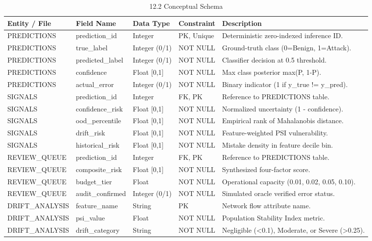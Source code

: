 \begin{table}[H]
\centering
\small
\begin{tabular}{p{} p{} p{} p{} p{}}
\toprule
\textbf{Entity / File} & \textbf{Field Name} & \textbf{Data Type} & \textbf{Constraint} & \textbf{Description} \\
\midrule
PREDICTIONS & prediction\_id & Integer & PK, Unique & Deterministic zero-indexed inference ID. \\
PREDICTIONS & true\_label & Integer (0/1) & NOT NULL & Ground-truth class (0=Benign, 1=Attack). \\
PREDICTIONS & predicted\_label & Integer (0/1) & NOT NULL & Classifier decision at 0.5 threshold. \\
PREDICTIONS & confidence & Float [0,1] & NOT NULL & Max class posterior max(P, 1-P). \\
PREDICTIONS & actual\_error & Integer (0/1) & NOT NULL & Binary indicator (1 if y\_true != y\_pred). \\
SIGNALS & prediction\_id & Integer & FK, PK & Reference to PREDICTIONS table. \\
SIGNALS & confidence\_risk & Float [0,1] & NOT NULL & Normalized uncertainty (1 - confidence). \\
SIGNALS & ood\_percentile & Float [0,1] & NOT NULL & Empirical rank of Mahalanobis distance. \\
SIGNALS & drift\_risk & Float [0,1] & NOT NULL & Feature-weighted PSI vulnerability. \\
SIGNALS & historical\_risk & Float [0,1] & NOT NULL & Mistake density in feature decile bin. \\
REVIEW\_QUEUE & prediction\_id & Integer & FK, PK & Reference to PREDICTIONS table. \\
REVIEW\_QUEUE & composite\_risk & Float [0,1] & NOT NULL & Synthesized four-factor score. \\
REVIEW\_QUEUE & budget\_tier & Float & NOT NULL & Operational capacity (0.01, 0.02, 0.05, 0.10). \\
REVIEW\_QUEUE & audit\_confirmed & Integer (0/1) & NOT NULL & Simulated oracle verified error status. \\
DRIFT\_ANALYSIS & feature\_name & String & PK & Network flow attribute name. \\
DRIFT\_ANALYSIS & psi\_value & Float & NOT NULL & Population Stability Index metric. \\
DRIFT\_ANALYSIS & drift\_category & String & NOT NULL & Negligible (<0.1), Moderate, or Severe (>0.25). \\
\bottomrule
\end{tabular}
\caption{12.2 Conceptual Schema}
\end{table}

